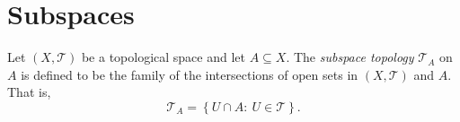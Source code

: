 \section{Subspaces}





\begin{definition}
	\label{def: subspace topology}
	Let $(X, \mathcal T)$ be a topological space and let $A \subseteq X$. The \textit{subspace topology} $\mathcal T_A$ on $A$ is defined to be the family of the intersections of open sets in $(X, \mathcal T)$ and $A$. That is,
	$$
	\mathcal T_A = \left\{ U \cap A : \ U \in \mathcal T \right\}.
	$$
\end{definition}
